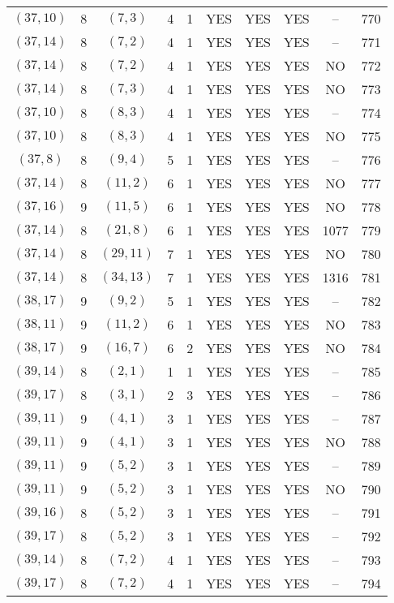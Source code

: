 \begin{longtable}{|c|c|c|c|c|c|c|c|c|c|}
$(37, 10)$ & 8 & $(7, 3)$ & 4 & 1 & YES & YES & YES & -- & 770\\
$(37, 14)$ & 8 & $(7, 2)$ & 4 & 1 & YES & YES & YES & -- & 771\\
$(37, 14)$ & 8 & $(7, 2)$ & 4 & 1 & YES & YES & YES & NO & 772\\
$(37, 14)$ & 8 & $(7, 3)$ & 4 & 1 & YES & YES & YES & NO & 773\\
$(37, 10)$ & 8 & $(8, 3)$ & 4 & 1 & YES & YES & YES & -- & 774\\
$(37, 10)$ & 8 & $(8, 3)$ & 4 & 1 & YES & YES & YES & NO & 775\\
$(37, 8)$ & 8 & $(9, 4)$ & 5 & 1 & YES & YES & YES & -- & 776\\
$(37, 14)$ & 8 & $(11, 2)$ & 6 & 1 & YES & YES & YES & NO & 777\\
$(37, 16)$ & 9 & $(11, 5)$ & 6 & 1 & YES & YES & YES & NO & 778\\
$(37, 14)$ & 8 & $(21, 8)$ & 6 & 1 & YES & YES & YES & 1077 & 779\\
$(37, 14)$ & 8 & $(29, 11)$ & 7 & 1 & YES & YES & YES & NO & 780\\
$(37, 14)$ & 8 & $(34, 13)$ & 7 & 1 & YES & YES & YES & 1316 & 781\\
$(38, 17)$ & 9 & $(9, 2)$ & 5 & 1 & YES & YES & YES & -- & 782\\
$(38, 11)$ & 9 & $(11, 2)$ & 6 & 1 & YES & YES & YES & NO & 783\\
$(38, 17)$ & 9 & $(16, 7)$ & 6 & 2 & YES & YES & YES & NO & 784\\
$(39, 14)$ & 8 & $(2, 1)$ & 1 & 1 & YES & YES & YES & -- & 785\\
$(39, 17)$ & 8 & $(3, 1)$ & 2 & 3 & YES & YES & YES & -- & 786\\
$(39, 11)$ & 9 & $(4, 1)$ & 3 & 1 & YES & YES & YES & -- & 787\\
$(39, 11)$ & 9 & $(4, 1)$ & 3 & 1 & YES & YES & YES & NO & 788\\
$(39, 11)$ & 9 & $(5, 2)$ & 3 & 1 & YES & YES & YES & -- & 789\\
$(39, 11)$ & 9 & $(5, 2)$ & 3 & 1 & YES & YES & YES & NO & 790\\
$(39, 16)$ & 8 & $(5, 2)$ & 3 & 1 & YES & YES & YES & -- & 791\\
$(39, 17)$ & 8 & $(5, 2)$ & 3 & 1 & YES & YES & YES & -- & 792\\
$(39, 14)$ & 8 & $(7, 2)$ & 4 & 1 & YES & YES & YES & -- & 793\\
$(39, 17)$ & 8 & $(7, 2)$ & 4 & 1 & YES & YES & YES & -- & 794\\

\end{longtable}
